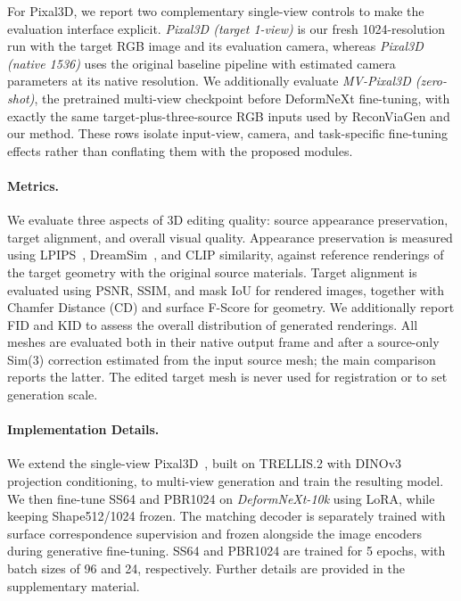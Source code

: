 {For Pixal3D, we report two complementary single-view controls to make the
evaluation interface explicit.  \emph{Pixal3D (target 1-view)} is our fresh
1024-resolution run with the target RGB image and its evaluation camera,
whereas \emph{Pixal3D (native 1536)} uses the original baseline pipeline with
estimated camera parameters at its native resolution.  We additionally
evaluate \emph{MV-Pixal3D (zero-shot)}, the pretrained multi-view checkpoint
before DeformNeXt fine-tuning, with exactly the same target-plus-three-source
RGB inputs used by ReconViaGen and our method.  These rows isolate input-view,
camera, and task-specific fine-tuning effects rather than conflating them with
the proposed modules.

\paragraph{Metrics.}
%
We evaluate three aspects of 3D editing quality: source appearance preservation, target alignment, and overall visual quality.
%
Appearance preservation is measured using LPIPS~\cite{zhang2018unreasonable}, DreamSim~\cite{fu2023dreamsim}, and CLIP similarity, against reference renderings of the target geometry with the original source materials.
%
Target alignment is evaluated using PSNR, SSIM, and mask IoU for rendered images, together with Chamfer Distance (CD) and surface F-Score for geometry.
%
We additionally report FID and KID to assess the overall distribution of generated renderings.
All meshes are evaluated both in their native output frame and after a
source-only Sim(3) correction estimated from the input source mesh; the main
comparison reports the latter.  The edited target mesh is never used for
registration or to set generation scale.

\paragraph{Implementation Details.}
%
We extend the single-view Pixal3D~\cite{li2026pixal3d}, built on TRELLIS.2 with DINOv3 projection conditioning, to multi-view generation and train the resulting model.
%
We then fine-tune SS64 and PBR1024 on \emph{DeformNeXt-10k} using LoRA, while keeping Shape512/1024 frozen.
%
The matching decoder is separately trained with surface correspondence supervision and frozen alongside the image encoders during generative fine-tuning.
%
SS64 and PBR1024 are trained for 5 epochs, with batch sizes of 96 and 24, respectively.
%
Further details are provided in the supplementary material.
}









